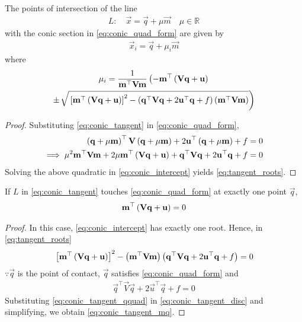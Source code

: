 
		\begin{theorem}[Chord]
  The points of intersection of the line 
\begin{align}
L: \quad \vec{x} = \vec{q} + \mu \vec{m} \quad \mu \in \mathbb{R}
\label{eq:conic_tangent}
\end{align}
with the conic section in \eqref{eq:conic_quad_form} are given by
\begin{align}
\vec{x}_i = \vec{q} + \mu_i \vec{m}
	\label{eq:chord-pts}
\end{align}
%
where
\begin{multline}
\mu_i = \frac{1}
{
\mathbf{m}^{\top}\mathbf{V}\mathbf{m}
}
\left(-\mathbf{m}^{\top}\left(\mathbf{V}\mathbf{q}+\mathbf{u}\right)\right.
\\
\pm
{\small
\ensuremath{\left.\sqrt{
{}\left[
\mathbf{m}^{\top}\left(\mathbf{V}\mathbf{q}+\mathbf{u}\right)
\right]^2
-
\left(
\mathbf{q}^{\top}\mathbf{V}\mathbf{q} + 2\mathbf{u}^{\top}\mathbf{q} +f
\right)
\left(\mathbf{m}^{\top}\mathbf{V}\mathbf{m}\right)
}
\right)}
}
\label{eq:tangent_roots}
\end{multline}


\end{theorem}
\begin{proof}
  Substituting \eqref{eq:conic_tangent}
in \eqref{eq:conic_quad_form}, 
\begin{align}
\left(\mathbf{q} + \mu \mathbf{m}\right)^{\top}\mathbf{V}\left(\mathbf{q} + \mu \mathbf{m}\right)  + 2 \mathbf{u}^{\top}\left(\mathbf{q} + \mu \mathbf{m}\right)+f &= 0
\\
\implies \mu^2\mathbf{m}^{\top}\mathbf{V}\mathbf{m} + 2 \mu\mathbf{m}^{\top}\left(\mathbf{V}\mathbf{q}+\mathbf{u}\right) 
+ \mathbf{q}^{\top}\mathbf{V}\mathbf{q} + 2\mathbf{u}^{\top}\mathbf{q} +f &= 0
\label{eq:conic_intercept}
\end{align}
Solving the above quadratic in \eqref{eq:conic_intercept}
yields \eqref{eq:tangent_roots}.
\end{proof}
\begin{corollary}
  If $L$ in \eqref{eq:conic_tangent} touches \eqref{eq:conic_quad_form} at exactly one point $\vec{q}$, 
  \begin{align}
  \mathbf{m}^{\top}\left(\mathbf{V}\mathbf{q}+\mathbf{u}\right) = 0
  \label{eq:conic_tangent_mq}
  \end{align}
\end{corollary}
\begin{proof}
  In this case, \eqref{eq:conic_intercept} has exactly one root.  Hence, 
  in \eqref{eq:tangent_roots}
  \begin{align}
  {}\left[
  \mathbf{m}^{\top}\left(\mathbf{V}\mathbf{q}+\mathbf{u}\right)
  \right]^2 -\left(\mathbf{m}^{\top}\mathbf{V}\mathbf{m}\right)
  \left(
  \mathbf{q}^{\top}\mathbf{V}\mathbf{q} + 2\mathbf{u}^{\top}\mathbf{q} +f
  \right) = 0                                                                                             
  \label{eq:conic_tangent_disc}
  \end{align}                    
  $\because \vec{q}$ is the point of contact, $\vec{q}$ satisfies \eqref{eq:conic_quad_form}
  and 
  \begin{align}
  \vec{q}^{\top}\vec{V}\vec{q} + 2\vec{u}^{\top}\vec{q} +f = 0
  \label{eq:conic_tangent_qquad}
  \end{align}
  Substituting \eqref{eq:conic_tangent_qquad} in \eqref{eq:conic_tangent_disc} and simplifying, we obtain \eqref{eq:conic_tangent_mq}.
\end{proof}
